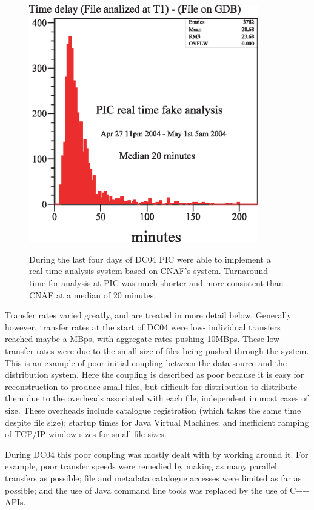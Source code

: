 \documentclass{cmspaper}
\begin{document}
\begin{figure}[tbp]
\centering
\includegraphics[width=10cm]{PIC-RTA.eps}
\label{fig:PIC-RTA}
\caption{During the last four days of DC04 PIC were able to implement a real time analysis system based on CNAF's system. Turnaround time for analysis at  PIC was much shorter and more consistent than CNAF at a median of 20 minutes.}
\end{figure} 

Transfer rates varied greatly, and are treated in more detail below. Generally however, transfer rates at the start of DC04 were low- individual transfers reached maybe a MBps, with aggregate rates pushing 10MBps. These low transfer rates were due to the small size of files being pushed through the system. This is an example of poor initial coupling between the data source and the distribution system. Here the coupling is described as poor because it is easy for reconstruction to produce small files, but difficult for distribution to distribute them due to the overheads associated with each file, independent in most cases of size. These overheads include catalogue registration (which takes the same time despite file size); startup times for Java Virtual Machines; and inefficient ramping of TCP/IP window sizes for small file sizes.

During DC04 this poor coupling was mostly dealt with by working around it. For example, poor transfer speeds were remedied by making as many parallel transfers as possible; file and metadata catalogue accesses were limited as far as possible; and the use of Java command line tools was replaced by the use of C++ APIs.
\end{document}
